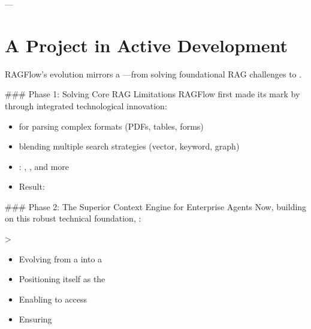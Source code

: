 \documentclass[letterpaper,10pt,english]{sphinxmanual}
\begin{document}
\sphinxAtStartPar
—


\section{A Project in Active Development}
\label{\detokenize{about:a-project-in-active-development}}
\sphinxAtStartPar
RAGFlow’s evolution mirrors a —from solving foundational RAG challenges to .

\sphinxAtStartPar
\#\#\# Phase 1: Solving Core RAG Limitations
RAGFlow first made its mark by  through integrated technological innovation:
\begin{itemize}
\item {} 
\sphinxAtStartPar
{} for parsing complex formats (PDFs, tables, forms)

\item {} 
\sphinxAtStartPar
{} blending multiple search strategies (vector, keyword, graph)

\item {} 
\sphinxAtStartPar
{}: , , and more

\item {} 
\sphinxAtStartPar
Result: 

\end{itemize}

\sphinxAtStartPar
\#\#\# Phase 2: The Superior Context Engine for Enterprise Agents
Now, building on this robust technical foundation, :

\sphinxAtStartPar
\textgreater{} 
\begin{itemize}
\item {} 
\sphinxAtStartPar
Evolving from a  into a 

\item {} 
\sphinxAtStartPar
Positioning itself as the 

\item {} 
\sphinxAtStartPar
Enabling  to access 

\item {} 
\sphinxAtStartPar
Ensuring 

\end{itemize}
\end{document}
